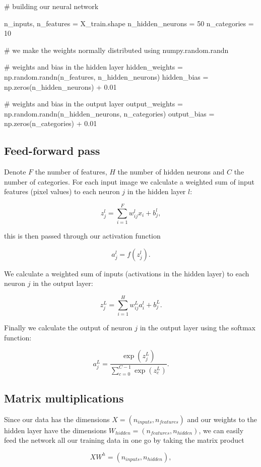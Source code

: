 \documentclass[%
oneside,                 %
final,                   %
10pt]{article}
\begin{document}
\bpycod
# building our neural network

n_inputs, n_features = X_train.shape
n_hidden_neurons = 50
n_categories = 10

# we make the weights normally distributed using numpy.random.randn

# weights and bias in the hidden layer
hidden_weights = np.random.randn(n_features, n_hidden_neurons)
hidden_bias = np.zeros(n_hidden_neurons) + 0.01

# weights and bias in the output layer
output_weights = np.random.randn(n_hidden_neurons, n_categories)
output_bias = np.zeros(n_categories) + 0.01

\epycod


\subsection{Feed-forward pass}

Denote $F$ the number of features, $H$ the number of hidden neurons and $C$ the number of categories.  
For each input image we calculate a weighted sum of input features (pixel values) to each neuron $j$ in the hidden layer $l$:  

$$ z_{j}^{l} = \sum_{i=1}^{F} w_{ij}^{l} x_i + b_{j}^{l},$$

this is then passed through our activation function  

$$ a_{j}^{l} = f(z_{j}^{l}) .$$  

We calculate a weighted sum of inputs (activations in the hidden layer) to each neuron $j$ in the output layer:  

$$ z_{j}^{L} = \sum_{i=1}^{H} w_{ij}^{L} a_{i}^{l} + b_{j}^{L}.$$  

Finally we calculate the output of neuron $j$ in the output layer using the softmax function:  

$$ a_{j}^{L} = \frac{\exp{(z_j^{L})}}
{\sum_{c=0}^{C-1} \exp{(z_c^{L})}} .$$  

\subsection{Matrix multiplications}

Since our data has the dimensions $X = (n_{inputs}, n_{features})$ and our weights to the hidden
layer have the dimensions  
$W_{hidden} = (n_{features}, n_{hidden})$,
we can easily feed the network all our training data in one go by taking the matrix product  

$$ X W^{h} = (n_{inputs}, n_{hidden}),$$ 
\end{document}
